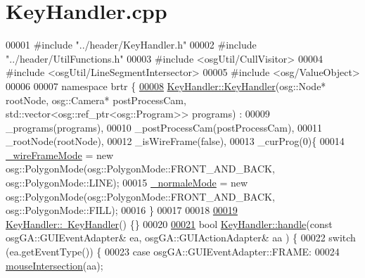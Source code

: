 \hypertarget{_key_handler_8cpp_source}{\section{Key\+Handler.\+cpp}
\label{_key_handler_8cpp_source}
}

\begin{DoxyCode}
00001 \textcolor{preprocessor}{#include "../header/KeyHandler.h"}
00002 \textcolor{preprocessor}{#include "../header/UtilFunctions.h"}
00003 \textcolor{preprocessor}{#include <osgUtil/CullVisitor>}
00004 \textcolor{preprocessor}{#include <osgUtil/LineSegmentIntersector>}
00005 \textcolor{preprocessor}{#include <osg/ValueObject>}
00006 
00007 \textcolor{keyword}{namespace }brtr \{
\hypertarget{_key_handler_8cpp_source_l00008}{}\hyperlink{classbrtr_1_1_key_handler_aaae067fabc959780a9fae9c700c199da}{00008}     \hyperlink{classbrtr_1_1_key_handler_aaae067fabc959780a9fae9c700c199da}{KeyHandler::KeyHandler}(osg::Node* rootNode, osg::Camera* postProcessCam, 
      std::vector<osg::ref\_ptr<osg::Program>> programs) :
00009         \_programs(programs),
00010         \_postProcessCam(postProcessCam),
00011         \_rootNode(rootNode),
00012         \_isWireFrame(false),
00013         \_curProg(0)\{
00014         \hyperlink{classbrtr_1_1_key_handler_a7aff4e23d4c614d8e0ccdc29a3c8882f}{\_wireFrameMode} = \textcolor{keyword}{new} osg::PolygonMode(osg::PolygonMode::FRONT\_AND\_BACK, 
      osg::PolygonMode::LINE);
00015         \hyperlink{classbrtr_1_1_key_handler_ae210945e48748029cbea37fde7d601b5}{\_normaleMode} = \textcolor{keyword}{new} osg::PolygonMode(osg::PolygonMode::FRONT\_AND\_BACK, 
      osg::PolygonMode::FILL);
00016     \}
00017 
00018 
\hypertarget{_key_handler_8cpp_source_l00019}{}\hyperlink{classbrtr_1_1_key_handler_aabad0b142ba1d2e648069b4e8af17797}{00019}     \hyperlink{classbrtr_1_1_key_handler_aabad0b142ba1d2e648069b4e8af17797}{KeyHandler::~KeyHandler}() \{\}
00020 
\hypertarget{_key_handler_8cpp_source_l00021}{}\hyperlink{classbrtr_1_1_key_handler_a02df9f4339712d5b8b2b25b89048cf47}{00021}     \textcolor{keywordtype}{bool} \hyperlink{classbrtr_1_1_key_handler_a02df9f4339712d5b8b2b25b89048cf47}{KeyHandler::handle}(\textcolor{keyword}{const} osgGA::GUIEventAdapter& ea, osgGA::GUIActionAdapter& aa
      ) \{
00022         \textcolor{keywordflow}{switch} (ea.getEventType()) \{
00023         \textcolor{keywordflow}{case} osgGA::GUIEventAdapter::FRAME:
00024             \hyperlink{classbrtr_1_1_key_handler_a7f402d48b863ed19ef47038a32d1d05c}{mouseIntersection}(aa);

\end{DoxyCode}
